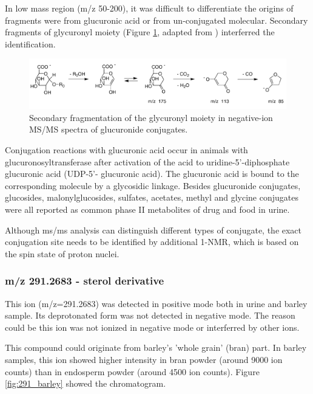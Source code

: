 In low mass region (m/z 50-200), it was difficult to differentiate the origins of fragments were from glucuronic acid or from un-conjugated molecular. Secondary fragments of glycuronyl moiety  (Figure \ref{fig:gluco_frag.PNG}, adapted from \cite{phase2}) interferred the identification.
\begin{figure}[h!]
    \centering
    \includegraphics[scale=0.45]{images/gluco_frag.PNG}
    \caption{Secondary fragmentation of the glycuronyl moiety in negative-ion MS/MS spectra of glucuronide conjugates.}
    \label{fig:gluco_frag.PNG}
\end{figure}

Conjugation reactions with glucuronic acid occur in animals with glucuronosyltransferase after activation of the acid to uridine-5'-diphosphate glucuronic acid (UDP-5'- glucuronic acid). The glucuronic acid is bound to the corresponding molecule by a glycosidic linkage\cite{phase2}.
Besides glucuronide conjugates, glucosides, malonylglucosides, sulfates, acetates, methyl and glycine conjugates were all reported as common phase II metabolites of drug and food in urine\cite{phase2}.

Although \acrshort{ms/ms} analysis can distinguish different types of conjugate, the exact conjugation site needs to be identified by additional 1-NMR\cite{phase2}, which is based on the spin state of proton nuclei.



\subsubsection{m/z 291.2683 - sterol derivative}
This ion (m/z=291.2683) was detected in positive mode both in urine and barley sample. Its deprotonated form was not detected in negative mode. The reason could be this ion was not ionized in negative mode or interferred by other ions.

This compound could originate from barley's 'whole grain' (bran) part. In barley samples, this ion showed higher intensity in bran powder (around 9000 ion counts) than in endosperm powder (around 4500 ion counts). Figure \ref{fig:291_barley} showed the chromatogram.

